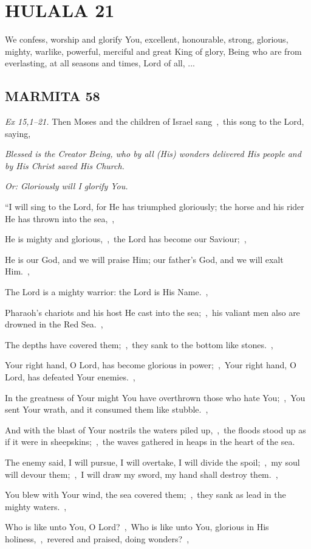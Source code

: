 \documentclass[12pt,twoside,a5paper]{article}
\newcommand{\hulala}[1]{\section*{HULALA {#1}}}
\newcommand{\marmita}[1]{\subsection*{MARMITA {#1}}}
\newcommand{\qanona}[1]{{\liturgicalhint{Qanona.} \emph{#1}}}
\newcommand{\slota}[1]{\liturgicalhint{Slota.} #1}
\newcommand{\scripture}[1]{\emph{#1.}}
\begin{document}
\hulala{21}

\slota{We confess, worship and glorify You, excellent, honourable, strong, glorious, mighty, warlike, powerful, merciful and great King of glory, Being who are from everlasting, at all seasons and times, Lord of all, ...}

\marmita{58}

\begin{normalparskip}
  \scripture{Ex 15,1--21} Then Moses and the children of Israel sang~\sep\ this song to the Lord, saying,

  \qanona{Blessed is the Creator Being, who by all (His) wonders delivered His people and by His Christ saved His Church.}

  \emph{Or: Gloriously will I glorify You.}

  ``I will sing to the Lord, for He has triumphed gloriously; the horse and his rider He has thrown into the sea,~\sep

  He is mighty and glorious,~\sep\ the Lord has become our Saviour;~\sep

  He is our God, and we will praise Him; our father's God, and we will exalt Him.~\sep

  The Lord is a mighty warrior: the Lord is His Name.~\sep

  Pharaoh's chariots and his host He cast into the sea;~\sep\ his valiant men also are drowned in the Red Sea.~\sep

  The depths have covered them;~\sep\ they sank to the bottom like stones.~\sep

  Your right hand, O Lord, has become glorious in power;~\sep\ Your right hand, O Lord, has defeated Your enemies.~\sep

  In the greatness of Your might You have overthrown those who hate You;~\sep\ You sent Your wrath, and it consumed them like stubble.~\sep

  And with the blast of Your nostrils the waters piled up,~\sep\ the floods stood up as if it were in sheepskins;~\sep\ the waves gathered in heaps in the heart of the sea.

  The enemy said, I will pursue, I will overtake, I will divide the spoil;~\sep\ my soul will devour them;~\sep\ I will draw my sword, my hand shall destroy them.~\sep

  You blew with Your wind, the sea covered them;~\sep\ they sank as lead in the mighty waters.~\sep

  Who is like unto You, O Lord?~\sep\ Who is like unto You, glorious in His holiness,~\sep\ revered and praised, doing wonders?~\sep


\end{normalparskip}
\end{document}
